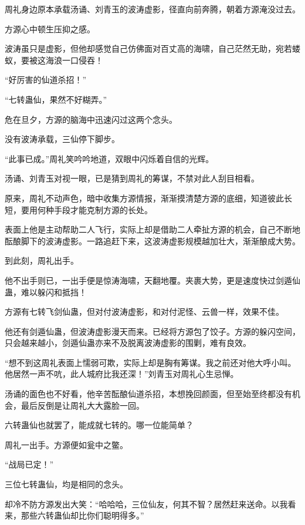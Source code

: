 
\begin{this_body}

周礼身边原本承载汤诵、刘青玉的波涛虚影，径直向前奔腾，朝着方源淹没过去。

方源心中顿生压抑之感。

波涛虽只是虚影，但他却感觉自己仿佛面对百丈高的海啸，自己茫然无助，宛若蝼蚁，要被这海浪一口侵吞！

“好厉害的仙道杀招！”

“七转蛊仙，果然不好糊弄。”

危在旦夕，方源的脑海中迅速闪过这两个念头。

没有波涛承载，三仙停下脚步。

“此事已成。”周礼笑吟吟地道，双眼中闪烁着自信的光辉。

汤诵、刘青玉对视一眼，已是猜到周礼的筹谋，不禁对此人刮目相看。

原来，周礼不动声色，暗中收集方源情报，渐渐摸清楚方源的底细，知道彼此长短，要用何种手段才能克制方源的长处。

表面上他是主动帮助二人飞行，实际上却是借助二人牵扯方源的机会，自己不断地酝酿脚下的波涛虚影。一路追赶下来，这波涛虚影规模越加壮大，渐渐酿成大势。

到此刻，周礼出手。

他不出手则已，一出手便是惊涛海啸，天翻地覆。夹裹大势，更是速度快过剑遁仙蛊，难以躲闪和抵挡！

方源有七转飞剑仙蛊，但对付波涛虚影，和对付泥怪、云兽一样，效果不佳。

他还有剑遁仙蛊，但波涛虚影漫天而来。已经将方源包了饺子。方源的躲闪空间，只会越来越小，剑遁仙蛊亦来不及脱离波涛虚影的围剿，难有良效。

“想不到这周礼表面上懦弱可欺，实际上却是胸有筹谋。我之前还对他大呼小叫。他居然一声不吭，此人城府比我还深！”刘青玉对周礼心生忌惮。

汤诵的面色也不好看，他辛苦酝酿仙道杀招，本想挽回颜面，但至始至终都没有机会，最后反倒是让周礼大大露脸一回。

六转蛊仙也就罢了，能成就七转的。哪一位能简单？

周礼一出手。方源便如瓮中之鳖。

“战局已定！”

三位七转蛊仙，均是相同的念头。

却冷不防方源发出大笑：“哈哈哈，三位仙友，何其不智？居然赶来送命。以我看来，那些六转蛊仙却比你们聪明得多。”


\end{this_body}
